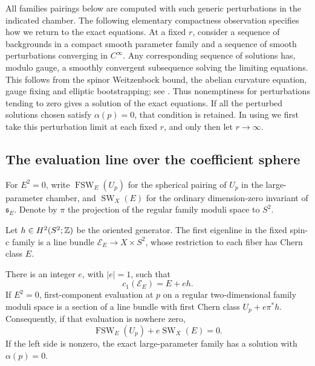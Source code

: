All families pairings below are computed with such generic
perturbations in the indicated chamber.  The following elementary
compactness observation specifies how we return to the exact
equations.  At a fixed \(r\), consider a sequence of backgrounds
in a compact smooth parameter family and a sequence of smooth
perturbations converging in \(C^\infty\).  Any corresponding
sequence of solutions has, modulo gauge, a smoothly convergent
subsequence solving the limiting equations.
This follows from the spinor Weitzenbock bound, the abelian
curvature equation, gauge fixing and elliptic bootstrapping; see
\cite[Section~2.1]{LiLiu2001}.  Thus nonemptiness for perturbations
tending to zero gives a solution of the exact equations.  If all
the perturbed solutions chosen satisfy \(\alpha(p)=0\), that
condition is retained.  In using
 we first take this
perturbation limit at each fixed \(r\), and only then let
\(r\to\infty\).

\subsection{The evaluation line over the coefficient sphere}

For \(E^2=0\), write \(\operatorname{FSW}_E(U_p)\) for the
spherical pairing of \(U_p\) in the large-parameter chamber, and
\(\operatorname{SW}_X(E)\) for the ordinary dimension-zero invariant
of \(\mathfrak s_E\).  Denote by \(\pi\) the projection of the
regular family moduli space to \(S^2\).

Let \(h\in H^2(S^2;\mathbb Z)\) be the oriented generator.  The first
eigenline in the fixed spin-c family is a line bundle
\(\mathcal E_E\to X\times S^2\), whose restriction to each
fiber has Chern class \(E\).

\begin{lemma}
 \label{lem:families-evaluation-line}
 There is an integer \(e\), with \(|e|=1\), such that
 \[
  c_1(\mathcal E_E)=E+eh.
 \]
 If \(E^2=0\), first-component evaluation at \(p\) on a regular
 two-dimensional family moduli space is a section of a line bundle
 with first Chern class \(U_p+e\pi^*h\).  Consequently, if that
 evaluation is nowhere zero,
 \begin{equation}
  \label{eq:families-evaluation-identity}
  \operatorname{FSW}_E(U_p)+e\operatorname{SW}_X(E)=0.
 \end{equation}
 If the left side is nonzero, the exact large-parameter family has
 a solution with \(\alpha(p)=0\).
\end{lemma}

